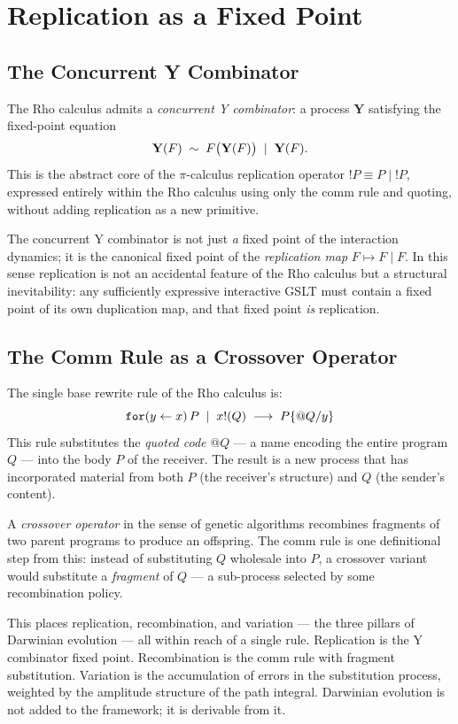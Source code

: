 \chapter{Replication as a Fixed Point}
\label{sec:replication}

\section{The Concurrent Y Combinator}

The Rho calculus admits a \emph{concurrent Y combinator}: a
process $\mathbf{Y}$ satisfying the fixed-point equation
\[
  \mathbf{Y}(F) \;\sim\; F\bigl(\mathbf{Y}(F)\bigr) \;\mid\; \mathbf{Y}(F).
\]
This is the abstract core of the $\pi$-calculus replication
operator $!P \equiv P \mid !P$, expressed entirely within the
Rho calculus using only the comm rule and quoting, without
adding replication as a new primitive.

\begin{remark}
The concurrent Y combinator is not just \emph{a} fixed point of
the interaction dynamics; it is the canonical fixed point of the
\emph{replication map} $F \mapsto F \mid F$.
In this sense replication is not an accidental feature of the
Rho calculus but a structural inevitability: any sufficiently
expressive interactive GSLT must contain a fixed point of its own
duplication map, and that fixed point \emph{is} replication.
\end{remark}

\section{The Comm Rule as a Crossover Operator}

The single base rewrite rule of the Rho calculus is:
\[
  \mathtt{for}(y \leftarrow x)\,P \;\mid\; x!(Q)
  \;\longrightarrow\;
  P\{@Q / y\}
\]
This rule substitutes the \emph{quoted code} $@Q$ --- a name
encoding the entire program $Q$ --- into the body $P$ of the
receiver.
The result is a new process that has incorporated material from
both $P$ (the receiver's structure) and $Q$ (the sender's content).

\begin{remark}
A \emph{crossover operator} in the sense of genetic algorithms
recombines fragments of two parent programs to produce an offspring.
The comm rule is one definitional step from this:
instead of substituting $Q$ wholesale into $P$, a crossover
variant would substitute a \emph{fragment} of $Q$ --- a sub-process
selected by some recombination policy.

This places replication, recombination, and variation --- the three
pillars of Darwinian evolution --- all within reach of a single
rule.
Replication is the Y combinator fixed point.
Recombination is the comm rule with fragment substitution.
Variation is the accumulation of errors in the substitution process,
weighted by the amplitude structure of the path integral.
Darwinian evolution is not added to the framework; it is derivable
from it.
\end{remark}

